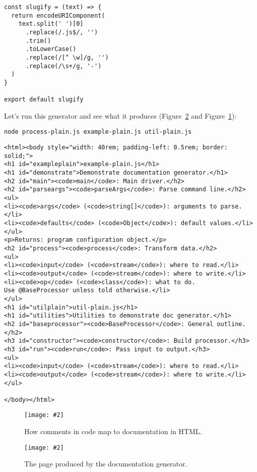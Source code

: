 \documentclass[krantzl]{krantz}
\newcommand{\figpdf}[4]{\begin{figure}%
\centering%
\texttt{[image: \#2]}%
\caption{#3}%
\label{#1}%
\end{figure}}
\newcommand{\figref}[1]{Figure~\ref{#1}}
\begin{document}
\begin{lstlisting}[frame=tblr]
const slugify = (text) => {
  return encodeURIComponent(
    text.split(' ')[0]
      .replace(/.js$/, '')
      .trim()
      .toLowerCase()
      .replace(/[^ \w]/g, '')
      .replace(/\s+/g, '-')
  )
}

export default slugify
\end{lstlisting}



Let’s run this generator and see what it produces
(\figref{doc-generator-process-plain} and \figref{doc-generator-mapping}):


\begin{lstlisting}[frame=shadowbox]
node process-plain.js example-plain.js util-plain.js
\end{lstlisting}



\begin{lstlisting}[frame=tblr,backgroundcolor=\color{black!5}]
<html><body style="width: 40rem; padding-left: 0.5rem; border: solid;">
<h1 id="exampleplain">example-plain.js</h1>
<h1 id="demonstrate">Demonstrate documentation generator.</h1>
<h2 id="main"><code>main</code>: Main driver.</h2>
<h2 id="parseargs"><code>parseArgs</code>: Parse command line.</h2>
<ul>
<li><code>args</code> (<code>string[]</code>): arguments to parse.</li>
<li><code>defaults</code> (<code>Object</code>): default values.</li>
</ul>
<p>Returns: program configuration object.</p>
<h2 id="process"><code>process</code>: Transform data.</h2>
<ul>
<li><code>input</code> (<code>stream</code>): where to read.</li>
<li><code>output</code> (<code>stream</code>): where to write.</li>
<li><code>op</code> (<code>class</code>): what to do.
Use @BaseProcessor unless told otherwise.</li>
</ul>
<h1 id="utilplain">util-plain.js</h1>
<h1 id="utilities">Utilities to demonstrate doc generator.</h1>
<h2 id="baseprocessor"><code>BaseProcessor</code>: General outline.</h2>
<h3 id="constructor"><code>constructor</code>: Build processor.</h3>
<h3 id="run"><code>run</code>: Pass input to output.</h3>
<ul>
<li><code>input</code> (<code>stream</code>): where to read.</li>
<li><code>output</code> (<code>stream</code>): where to write.</li>
</ul>

</body></html>
\end{lstlisting}


\figpdf{doc-generator-mapping}{./doc-generator/mapping.pdf}{How comments in code map to documentation in HTML.}{0.6}

\figpdf{doc-generator-process-plain}{./doc-generator/process-plain.pdf}{The page produced by the documentation generator.}{0.4}
\end{document}
